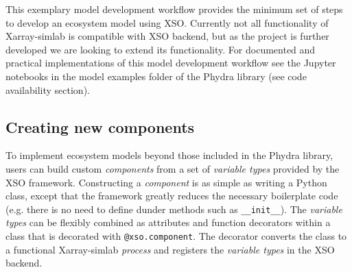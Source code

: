 \documentclass[journal abbreviation, manuscript]{copernicus}
\begin{document}
This exemplary model development workflow provides the minimum set of steps to develop an ecosystem model using XSO. Currently not all functionality of Xarray-simlab is compatible with XSO backend, but as the project is further developed we are looking to extend its functionality. For documented and practical implementations of this model development workflow see the Jupyter notebooks in the model examples folder of the Phydra library (see code availability section).

\subsection{Creating new components}  \label{Section:CreatingXSOComponent}

To implement ecosystem models beyond those included in the Phydra library, users can build custom \textit{components} from a set of \textit{variable types} provided by the XSO framework. Constructing a \textit{component} is as simple as writing a Python class, except that the framework greatly reduces the necessary boilerplate code (e.g. there is no need to define dunder methods such as \texttt{\_\_init\_\_}). The \textit{variable types} can be flexibly combined as attributes and function decorators within a class that is decorated with \texttt{@xso.component}. The decorator converts the class to a functional Xarray-simlab \textit{process} and registers the \textit{variable types} in the XSO backend.
\end{document}
